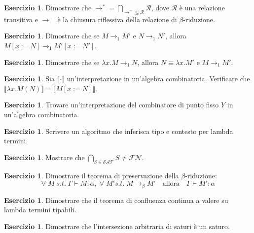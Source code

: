 \documentclass[oneside]{amsart}
\numberwithin{equation}{section}
\numberwithin{figure}{section}
\theoremstyle{plain}
\theoremstyle{definition}
\newtheorem{xca}[thm]{Esercizio}
\begin{document}
\begin{xca}
Dimostrare che $\rightarrow^{*} = \underset{\rightarrow^{=} \subseteq \mathcal{R}}{\bigcap} \mathcal{R}$,
dove $\mathcal{R}$ è una relazione transitiva e $\rightarrow^{=}$ è la chiusura riflessiva
della relazione di $\beta$-riduzione.
\end{xca}

\begin{xca}
Dimostrare che se $M \rightarrow_1 M'$ e $N \rightarrow_1 N'$, allora $M[x:=N] \rightarrow_1 M'[x:=N']$.
\end{xca}

\begin{xca}
Dimostrare che se ${\lambda}x.M \rightarrow_1 N$, allora
$N \equiv {\lambda}x.M'$ e $M \rightarrow_1 M'$.
\end{xca}

\begin{xca}
Sia $\llbracket\cdot\rrbracket$ un'interpretazione in un'algebra combinatoria. Verificare
che $\llbracket {\lambda}x.M(N) \rrbracket = \llbracket M[x:=N] \rrbracket$.
\end{xca}

\begin{xca}
Trovare un'interpretazione del combinatore di punto fisso $Y$ in un'algebra combinatoria.
\end{xca}

\begin{xca}
Scrivere un algoritmo che inferisca tipo e contesto per lambda termini.
\end{xca}

\begin{xca}
Mostrare che $\underset{S \in \mathcal{SAT}}{\bigcap}S \neq \mathcal{FN}$.
\end{xca}

\begin{xca}
Dimostrare il teorema di preservazione della $\beta$-riduzione:
\[ \forall \; M \; s.t. \; {\Gamma \vdash M:\alpha}, \; \forall \;
M' s.t. \; M\rightarrow_\beta M' \quad\text{allora}\quad \Gamma \vdash M':\alpha \]
\end{xca}

\begin{xca}
Dimostrare che il teorema di confluenza continua a valere su lambda termini tipabili.
\end{xca}

\begin{xca}
Dimostrare che l'intersezione arbitraria di saturi è un saturo.
\end{xca}
\end{document}
